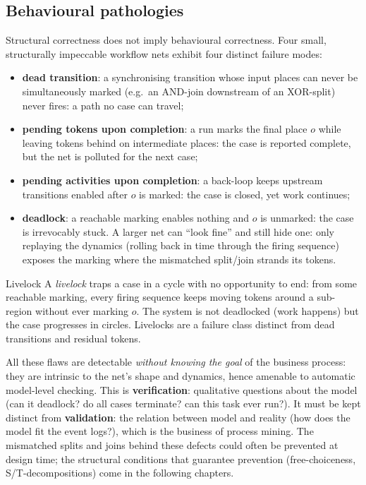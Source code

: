 \subsection{Behavioural pathologies}

Structural correctness does not imply behavioural correctness. Four small, structurally impeccable workflow nets exhibit four distinct failure modes:
\begin{itemize}
  \item \textbf{dead transition}: a synchronising transition whose input places can never be simultaneously marked (e.g.\ an AND-join downstream of an XOR-split) never fires: a path no case can travel;
  \item \textbf{pending tokens upon completion}: a run marks the final place $o$ while leaving tokens behind on intermediate places: the case is reported complete, but the net is polluted for the next case;
  \item \textbf{pending activities upon completion}: a back-loop keeps upstream transitions enabled after $o$ is marked: the case is closed, yet work continues;
  \item \textbf{deadlock}: a reachable marking enables nothing and $o$ is unmarked: the case is irrevocably stuck. A larger net can ``look fine'' and still hide one: only replaying the dynamics (rolling back in time through the firing sequence) exposes the marking where the mismatched split/join strands its tokens.
\end{itemize}

\begin{definitionbox}{Livelock}
A \emph{livelock} traps a case in a cycle with no opportunity to end: from some reachable marking, every firing sequence keeps moving tokens around a sub-region without ever marking $o$. The system is not deadlocked (work happens) but the case progresses in circles. Livelocks are a failure class distinct from dead transitions and residual tokens.
\end{definitionbox}

All these flaws are detectable \emph{without knowing the goal} of the business process: they are intrinsic to the net's shape and dynamics, hence amenable to automatic model-level checking. This is \textbf{verification}: qualitative questions about the model (can it deadlock? do all cases terminate? can this task ever run?). It must be kept distinct from \textbf{validation}: the relation between model and reality (how does the model fit the event logs?), which is the business of process mining. The mismatched splits and joins behind these defects could often be prevented at design time; the structural conditions that guarantee prevention (free-choiceness, S/T-decompositions) come in the following chapters.

